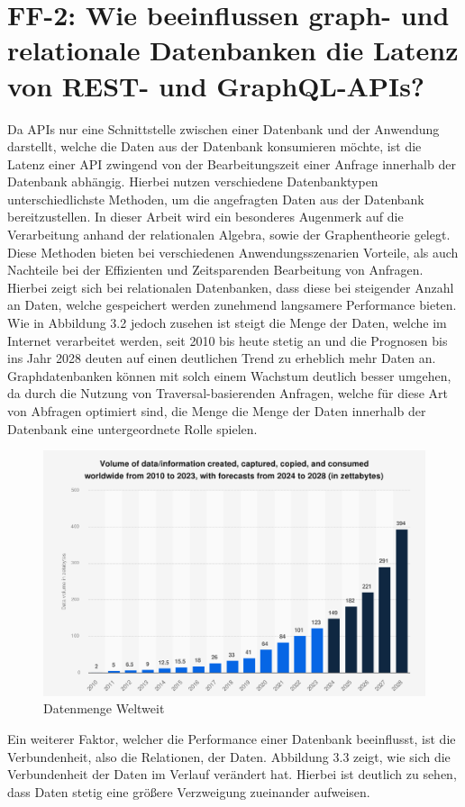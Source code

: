 \section{FF-2: Wie beeinflussen graph- und relationale Datenbanken die Latenz von REST- und GraphQL-APIs?} %
\label{sec:ff2}
Da APIs nur eine Schnittstelle zwischen einer Datenbank und der Anwendung darstellt, welche die Daten aus der Datenbank konsumieren möchte, ist die Latenz einer API zwingend von der Bearbeitungszeit einer Anfrage innerhalb der Datenbank abhängig. Hierbei nutzen verschiedene Datenbanktypen unterschiedlichste Methoden, um die angefragten Daten aus der Datenbank bereitzustellen. In dieser Arbeit wird ein besonderes Augenmerk auf die Verarbeitung anhand der relationalen Algebra, sowie der Graphentheorie gelegt. Diese Methoden bieten bei verschiedenen Anwendungsszenarien Vorteile, als auch Nachteile bei der Effizienten und Zeitsparenden Bearbeitung von Anfragen. Hierbei zeigt sich bei relationalen Datenbanken, dass diese bei steigender Anzahl an Daten, welche gespeichert werden zunehmend langsamere Performance bieten.
Wie in Abbildung 3.2 jedoch zusehen ist steigt die Menge der Daten, welche im Internet verarbeitet werden, seit 2010 bis heute stetig an und die Prognosen bis ins Jahr 2028 deuten auf einen deutlichen Trend zu erheblich mehr Daten an. Graphdatenbanken können mit solch einem Wachstum deutlich besser umgehen, da durch die Nutzung von Traversal-basierenden Anfragen, welche für diese  Art von Abfragen optimiert sind, die Menge die Menge der Daten innerhalb der Datenbank eine untergeordnete Rolle spielen. \citep{9677042} \citep{performancenosql}
\begin{figure}[H]
	\centering
	\includegraphics[scale=.4]{Illustrations/growthofdata.png}
	\caption{Datenmenge Weltweit \citep{statista}}
\end{figure}
\noindent
Ein weiterer Faktor, welcher die Performance einer Datenbank beeinflusst, ist die Verbundenheit, also die Relationen, der Daten. Abbildung 3.3 zeigt, wie sich die Verbundenheit der Daten im Verlauf verändert hat. Hierbei ist deutlich zu sehen, dass Daten stetig eine größere Verzweigung zueinander aufweisen. 

